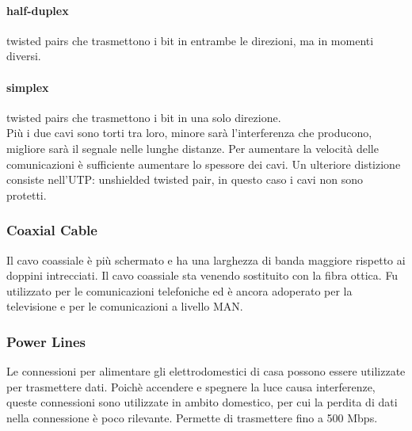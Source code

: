 \documentclass{article}
\begin{document}
\paragraph{half-duplex} twisted pairs che trasmettono i bit in entrambe le
direzioni, ma in momenti diversi.

\paragraph{simplex} twisted pairs che trasmettono i bit in una solo direzione.\\

Più i due cavi sono torti tra loro, minore sarà l'interferenza che producono,
migliore sarà il segnale nelle lunghe distanze. Per aumentare la velocità
delle comunicazioni è sufficiente aumentare lo spessore dei cavi.
Un ulteriore distizione consiste nell'UTP: unshielded twisted pair, in
questo caso i cavi non sono protetti.

\subsubsection{Coaxial Cable}
Il cavo coassiale è più schermato e ha una larghezza di banda maggiore rispetto
ai doppini intrecciati. Il cavo coassiale sta venendo sostituito con la fibra
ottica. Fu utilizzato per le comunicazioni telefoniche ed è ancora adoperato per
la televisione e per le comunicazioni a livello MAN.

\subsubsection{Power Lines}
Le connessioni per alimentare gli elettrodomestici di casa possono essere
utilizzate per trasmettere dati. Poichè accendere e spegnere la luce causa
interferenze, queste connessioni sono utilizzate in ambito domestico, per cui la
perdita di dati nella connessione è poco rilevante. Permette di
trasmettere fino a 500 Mbps.
\end{document}
